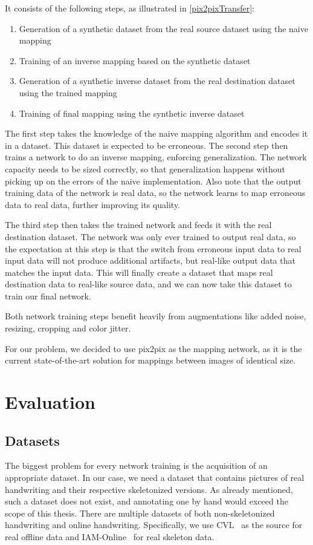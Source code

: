 It consists of the following steps, as illustrated in \cref{pix2pixTransfer}:
\begin{enumerate}
\item Generation of a synthetic dataset from the real source dataset using the naive mapping
\item Training of an inverse mapping based on the synthetic dataset
\item Generation of a synthetic inverse dataset from the real destination dataset using the trained mapping
\item Training of final mapping using the synthetic inverse dataset
\end{enumerate}

The first step takes the knowledge of the naive mapping algorithm and encodes it in a dataset. This dataset is expected to be erroneous. The second step then trains a network to do an inverse mapping, enforcing generalization. The network capacity needs to be sized correctly, so that generalization happens without picking up on the errors of the naive implementation. Also note that the output training data of the network is real data, so the network learns to map erroneous data to real data, further improving its quality.

The third step then takes the trained network and feeds it with the real destination dataset.
The network was only ever trained to output real data, so the expectation at this step is that the switch from erroneous input data to real input data will not produce additional artifacts, but real-like output data that matches the input data. This will finally create a dataset that maps real destination data to real-like source data, and we can now take this dataset to train our final network.

Both network training steps benefit heavily from augmentations like added noise, resizing, cropping and color jitter.

For our problem, we decided to use \gls{pix2pix} as the mapping network, as it is the current state-of-the-art solution for mappings between images of identical size.

\section{Evaluation}
\subsection{Datasets}
The biggest problem for every network training is the acquisition of an appropriate dataset.
In our case, we need a dataset that contains pictures of real handwriting and their respective skeletonized versions. As already mentioned, such a dataset does not exist, and annotating one by hand would exceed the scope of this thesis. There are multiple datasets of both non-skeletonized handwriting and online handwriting. Specifically, we use CVL~\cite{cvl} as the source for real offline data and IAM-Online~\cite{iam-online} for real skeleton data.

